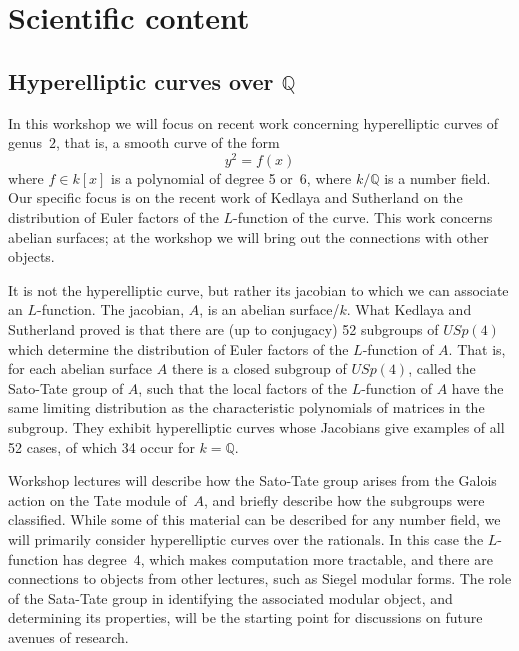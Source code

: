 \documentclass[amstex,11pt]{amsart}
\numberwithin{equation}{section}
\newcommand{\Q}{\mathbb Q}
\begin{document}
\section{Scientific content}

\subsection{Hyperelliptic curves over $\Q$}

In this workshop we will focus on recent work concerning hyperelliptic 
curves
of genus~$2$, that is, a smooth curve of the form
\begin{equation}
y^2=f(x)
\end{equation}
where $f\in k[x]$ is a polynomial of degree 5 or~6, where $k/\Q$ is a 
number field.
Our specific focus is on the recent work of Kedlaya and Sutherland on the
distribution of Euler factors of the $L$-function of the curve.  This work
concerns abelian surfaces; at the workshop we will bring out the 
connections
with other objects.

It is not the hyperelliptic curve, but rather its jacobian to which we
can associate an $L$-function.  The jacobian, $A$, is an abelian 
surface/$k$.
What Kedlaya and Sutherland proved is that there are (up to conjugacy)
52 subgroups of $USp(4)$ which determine the distribution of Euler factors
of the $L$-function of $A$.  That is, for each abelian surface $A$ there is
a closed subgroup of $USp(4)$, called the Sato-Tate group of $A$,
such that the local factors of the
$L$-function of $A$ have the same limiting distribution as the 
characteristic
polynomials of matrices in the subgroup.
They exhibit hyperelliptic curves whose Jacobians give examples of all 52 
cases,
of which 34 occur for $k=\Q$.

Workshop lectures will describe how the Sato-Tate group arises
from the Galois action on the Tate module of~$A$, and briefly describe how
the subgroups were classified.  While some of this material can be 
described
for any number field, we will primarily consider hyperelliptic curves over 
the
rationals.  In this case the $L$-function has degree~4, which makes 
computation
more tractable, and there are connections to objects from other lectures,
such as Siegel modular forms.  The role of the Sata-Tate group in 
identifying
the associated modular object, and determining its properties, will be the
starting point for discussions on future avenues of research.



\end{document}
